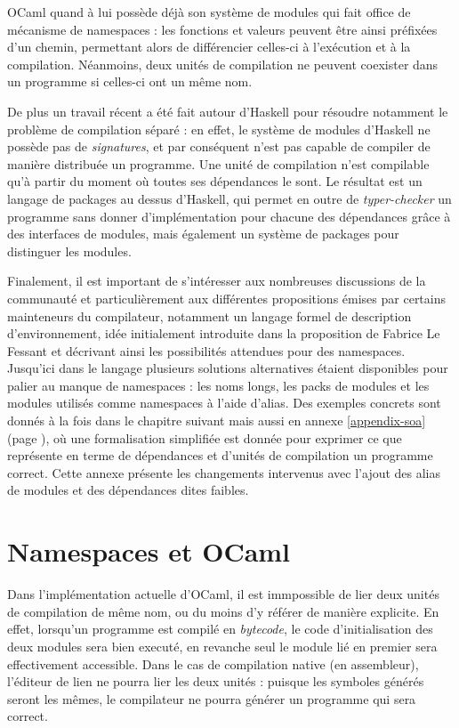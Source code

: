 \documentclass[11pt,a4paper]{report}
\begin{document}
OCaml quand à lui possède déjà son système de modules\cite{Leroy00} qui fait
office de mécanisme de namespaces : les fonctions et valeurs peuvent être ainsi
préfixées d'un chemin, permettant alors de différencier celles-ci à l'exécution
et à la compilation. Néanmoins, deux unités de compilation ne peuvent coexister
dans un programme si celles-ci ont un même nom.

De plus un travail récent a été fait autour d'Haskell pour résoudre notamment
le problème de compilation séparé\cite{KilpatrickDJM14} : en effet, le système
de modules d'Haskell ne possède pas de \emph{signatures}, et par conséquent
n'est pas capable de compiler de manière distribuée un programme. Une unité de
compilation n'est compilable qu'à partir du moment où toutes ses dépendances le
sont. Le résultat est un langage de packages au dessus d'Haskell, qui permet en
outre de \emph{typer-checker} un programme sans donner d'implémentation pour
chacune des dépendances grâce à des interfaces de modules, mais également un
système de packages pour distinguer les modules.

Finalement, il est important de s'intéresser aux nombreuses discussions de la
communauté\cite{ocaml-platform} et particulièrement aux différentes propositions
émises par certains mainteneurs du compilateur\cite{ocaml-proposals}, notamment
un langage formel de description d'environnement\cite{remy-scherer-prop}, idée
initialement introduite dans la proposition de Fabrice Le
Fessant\cite{lefessant-prop} et décrivant ainsi les possibilités attendues pour
des namespaces. Jusqu'ici dans le langage plusieurs solutions alternatives
étaient disponibles pour palier au manque de namespaces : les noms longs, les
packs de modules et les modules utilisés comme namespaces à l'aide d'alias. Des
exemples concrets sont donnés à la fois dans le chapitre suivant mais aussi en
annexe \ref{appendix-soa} (page \pageref{appendix-soa}), où une formalisation
simplifiée est donnée pour exprimer ce que représente en terme de dépendances et
d'unités de compilation un programme correct. Cette annexe présente les
changements intervenus avec l'ajout des alias de modules et des dépendances
dites faibles.

\section{Namespaces et OCaml}

Dans l'implémentation actuelle d'OCaml, il est immpossible de lier deux unités
de compilation de même nom, ou du moins d'y référer de manière explicite. En
effet, lorsqu'un programme est compilé en \emph{bytecode}, le code
d'initialisation des deux modules sera bien executé, en revanche seul le module
lié en premier sera effectivement accessible. Dans le cas de compilation native
(en assembleur), l'éditeur de lien ne pourra lier les deux unités : puisque les
symboles générés seront les mêmes, le compilateur ne pourra générer un programme
qui sera correct.
\end{document}
